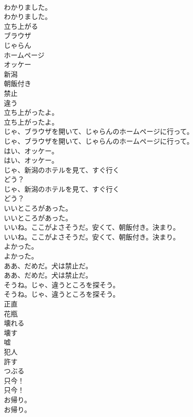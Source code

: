 \documentclass[8pt]{extreport}
\begin{document}
\begin{CJK}{UTF8}{min}
\\	わかりました。	
\\	わかりました。 
\\	立ち上がる
\\	ブラウザ
\\	じゃらん
\\	ホームページ
\\	オッケー
\\	新潟
\\	朝飯付き
\\	禁止
\\	違う
\\	立ち上がったよ。	
\\	立ち上がったよ。 
\\	じゃ、ブラウザを開いて、じゃらんのホームページに行って。	
\\	じゃ、ブラウザを開いて、じゃらんのホームページに行って。 
\\	はい、オッケー。	
\\	はい、オッケー。 
\\	じゃ、新潟のホテルを見て、すぐ行く
\\	どう？	
\\	じゃ、新潟のホテルを見て、すぐ行く
\\	どう？ 
\\	いいところがあった。	
\\	いいところがあった。 
\\	いいね。ここがよさそうだ。安くて、朝飯付き。決まり。	
\\	いいね。ここがよさそうだ。安くて、朝飯付き。決まり。 
\\	よかった。	
\\	よかった。 
\\	ああ、だめだ。犬は禁止だ。	
\\	ああ、だめだ。犬は禁止だ。 
\\	そうね。じゃ、違うところを探そう。	
\\	そうね。じゃ、違うところを探そう。 
\\	正直
\\	花瓶
\\	壊れる
\\	壊す
\\	嘘
\\	犯人
\\	許す
\\	つぶる
\\	只今！	
\\	只今！ 
\\	お帰り。	
\\	お帰り。 

\end{CJK}
\end{document}
